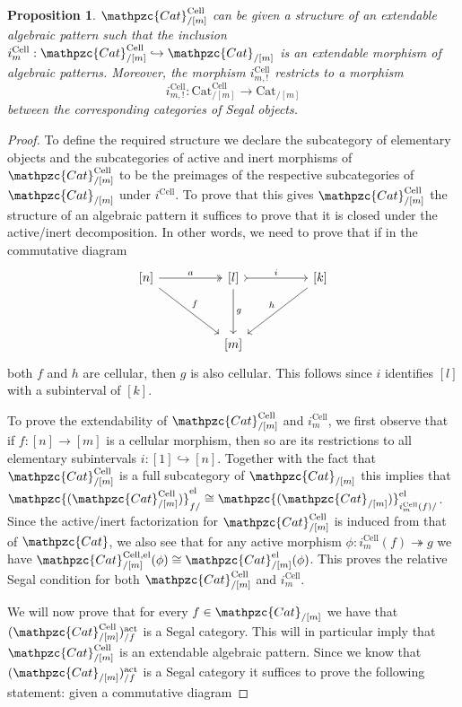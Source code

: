 \documentclass[a4paper, reqno]{amsart}
\newtheorem{prop}[theorem]{Proposition}
\theoremstyle{definition}
\newcommand\cat{\mathrm{Cat}}
\newcommand\ccat{\mathpzc{Cat}}
\newcommand\cell{\mathrm{Cell}}
\newcommand\act{\mathrm{act}}
\newcommand\el{\mathrm{el}}
\newcommand{\mElo}[2]{\mathpzc{#1}^{\mathrm{el}}_{#2/}}
\begin{document}
\begin{prop}\label{prop:cell_def}
$\mathpzc{Cat}^{\mathrm{Cell}}_{/[m]}$ can be given a structure of an extendable algebraic pattern such that the inclusion $i_m^{\mathrm{Cell}}:\mathpzc{Cat}^{\mathrm{Cell}}_{/[m]}\hookrightarrow \mathpzc{Cat}_{/[m]}$ is an extendable morphism of algebraic patterns. Moreover, the morphism $i^\cell_{m,!}$ restricts to a morphism
\[i^\cell_{m,!}:\cat^\cell_{/[m]}\rightarrow\cat_{/[m]}\]
between the corresponding categories of Segal objects.
\end{prop}
\begin{proof}
To define the required structure we declare the subcategory of elementary objects and the subcategories of active and inert morphisms of $\mathpzc{Cat}^{\mathrm{Cell}}_{/[m]}$ to be the preimages of the respective subcategories of $\mathpzc{Cat}_{/[m]}$ under $i^\mathrm{Cell}$. To prove that this gives $\mathpzc{Cat}^{\mathrm{Cell}}_{/[m]}$ the structure of an algebraic pattern it suffices to prove that it is closed under the active/inert decomposition. In other words, we need to prove that if in the commutative diagram
\[
\begin{tikzcd}[row sep=huge, column sep=huge]
{[n]}\arrow[r, two heads, "a"]\arrow[rd, "f"]&{[l]}\arrow[r, tail, "i"]\arrow[d, "g"]&{[k]}\arrow[ld, "h" swap]\\
{}&{[m]}
\end{tikzcd}
\]
both $f$ and $h$ are cellular, then $g$ is also cellular. This follows since $i$ identifies $[l]$ with a subinterval of $[k]$.\par
To prove the extendability of $\ccat^\cell_{/[m]}$ and $i_m^\cell$, we first observe that if $f:[n]\rightarrow [m]$ is a cellular morphism, then so are its restrictions to all elementary subintervals $i:[1]\hookrightarrow [n]$. Together with the fact that $\mathpzc{Cat}^{\mathrm{Cell}}_{/[m]}$ is a full subcategory of $\mathpzc{Cat}_{/[m]}$ this implies that $\mElo{(\mathpzc{Cat}^{\mathrm{Cell}}_{/[m]})}{f}\cong\mElo{(\mathpzc{Cat}_{/[m]})}{i_m^{\mathrm{Cell}}(f)}$. Since the active/inert factorization for $\ccat^\cell_{/[m]}$ is induced from that of $\ccat$, we also see that for any active morphism $\phi:i^\cell_m(f)\twoheadrightarrow g$ we have $\mathpzc{Cat}^{\mathrm{Cell},\el}_{/[m]}(\phi)\cong\mathpzc{Cat}^\el_{/[m]}(\phi)$. This proves the relative Segal condition for both $\ccat^\cell_{/[m]}$ and $i_m^\cell$.\par 
We will now prove that for every $f\in\mathpzc{Cat}_{/[m]}$ we have that $(\mathpzc{Cat}^{\mathrm{Cell}}_{/[m]})^\act_{/f}$ is a Segal category. This will in particular imply that $\ccat^\cell_{/[m]}$ is an extendable algebraic pattern. Since we know that $(\ccat_{/[m]})^\act_{/f}$ is a Segal category it suffices to prove the following statement: given a commutative diagram 

\end{proof}
\end{document}
